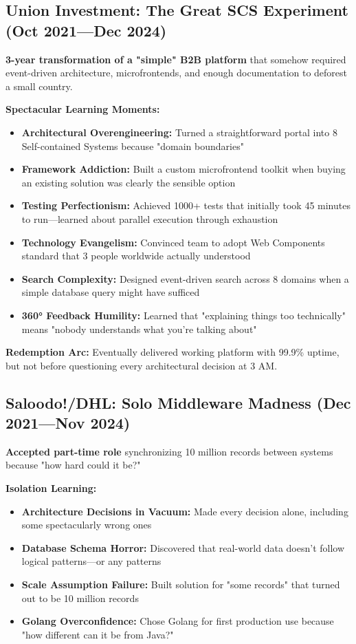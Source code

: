 \documentclass[10pt,a4paper]{article}
\begin{document}
\subsection{Union Investment: The Great SCS Experiment (Oct 2021—Dec 2024)}

\textbf{3-year transformation of a "simple" B2B platform} that somehow required event-driven architecture, microfrontends, and enough documentation to deforest a small country.

\textbf{Spectacular Learning Moments:}
\begin{itemize}
\item \textbf{Architectural Overengineering:} Turned a straightforward portal into 8 Self-contained Systems because "domain boundaries"
\item \textbf{Framework Addiction:} Built a custom microfrontend toolkit when buying an existing solution was clearly the sensible option
\item \textbf{Testing Perfectionism:} Achieved 1000+ tests that initially took 45 minutes to run—learned about parallel execution through exhaustion
\item \textbf{Technology Evangelism:} Convinced team to adopt Web Components standard that 3 people worldwide actually understood
\item \textbf{Search Complexity:} Designed event-driven search across 8 domains when a simple database query might have sufficed
\item \textbf{360° Feedback Humility:} Learned that "explaining things too technically" means "nobody understands what you're talking about"
\end{itemize}

\textbf{Redemption Arc:} Eventually delivered working platform with 99.9\% uptime, but not before questioning every architectural decision at 3 AM.

\subsection{Saloodo!/DHL: Solo Middleware Madness (Dec 2021—Nov 2024)}

\textbf{Accepted part-time role} synchronizing 10 million records between systems because "how hard could it be?"

\textbf{Isolation Learning:}
\begin{itemize}
\item \textbf{Architecture Decisions in Vacuum:} Made every decision alone, including some spectacularly wrong ones
\item \textbf{Database Schema Horror:} Discovered that real-world data doesn't follow logical patterns—or any patterns
\item \textbf{Scale Assumption Failure:} Built solution for "some records" that turned out to be 10 million records
\item \textbf{Golang Overconfidence:} Chose Golang for first production use because "how different can it be from Java?"
\end{itemize}
\end{document}
